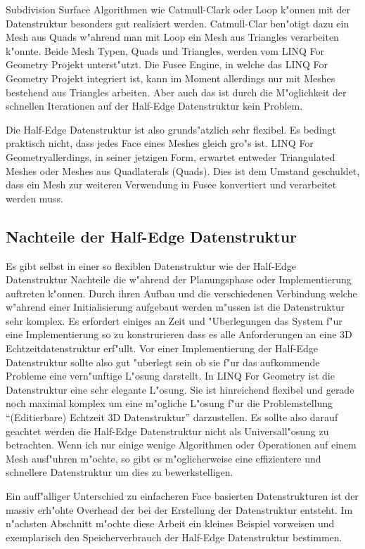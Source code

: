 \documentclass[pagesize, paper=a4, fontsize=12pt,titlepage=true, headings=small, headnosepline, abstractoff, liststotoc, nochapterprefix, plainheadsepline]{scrreprt}
\newcommand{\LFG}{LINQ For Geometry}
\newcommand{\LFGS}{LINQ For Geometry }
\newcommand{\HES}{Half-Edge Datenstruktur }
\begin{document}
Subdivision Surface Algorithmen wie Catmull-Clark oder Loop k"onnen mit der Datenstruktur besonders gut realisiert werden. Catmull-Clar ben"otigt dazu ein Mesh aus Quads w"ahrend man mit Loop ein Mesh aus Triangles verarbeiten k"onnte. Beide Mesh Typen, Quads und Triangles, werden vom \LFGS Projekt unterst"utzt. Die Fusee Engine, in welche das \LFGS Projekt integriert ist, kann im Moment allerdings nur mit Meshes bestehend aus Triangles arbeiten. Aber auch das ist durch die M"oglichkeit der schnellen Iterationen auf der \HES kein Problem.

Die \HES ist also grunds"atzlich sehr flexibel. Es bedingt praktisch nicht, dass jedes Face eines Meshes gleich gro"s ist. \LFG allerdings, in seiner jetzigen Form, erwartet entweder Triangulated Meshes oder Meshes aus Quadlaterals (Quads). Dies ist dem Umstand geschuldet, dass ein Mesh zur weiteren Verwendung in Fusee konvertiert und verarbeitet werden muss.
		\subsection {Nachteile der \HES}
Es gibt selbst in einer so flexiblen Datenstruktur wie der \HES Nachteile die w"ahrend der Planungsphase oder Implementierung auftreten k"onnen.
			Durch ihren Aufbau und die verschiedenen Verbindung welche w"ahrend einer Initialisierung aufgebaut werden m"ussen ist die Datenstruktur sehr komplex. Es erfordert einiges an Zeit und "Uberlegungen das System f"ur eine Implementierung so zu konstrurieren dass es alle Anforderungen an eine 3D Echtzeitdatenstruktur erf"ullt. Vor einer Implementierung der \HES sollte also gut "uberlegt sein ob sie f"ur das aufkommende Probleme eine vern"unftige L"osung darstellt. In \LFGS ist die Datenstruktur eine sehr elegante L"osung. Sie ist hinreichend flexibel und gerade noch maximal komplex um eine m"ogliche L"osung f"ur die Problemstellung "`(Editierbare) Echtzeit 3D Datenstruktur"' darzustellen. Es sollte also darauf geachtet werden die \HES nicht als Universall"osung zu betrachten. Wenn ich nur einige wenige Algorithmen oder Operationen auf einem Mesh ausf"uhren m"ochte, so gibt es m"oglicherweise eine effizientere und schnellere Datenstruktur um dies zu bewerkstelligen.

Ein auff"alliger Unterschied zu einfacheren Face basierten Datenstrukturen ist der massiv erh"ohte Overhead der bei der Erstellung der Datenstruktur entsteht. Im n"achsten Abschnitt m"ochte diese Arbeit ein kleines Beispiel vorweisen und exemplarisch den Speicherverbrauch der \HES bestimmen.
\end{document}
